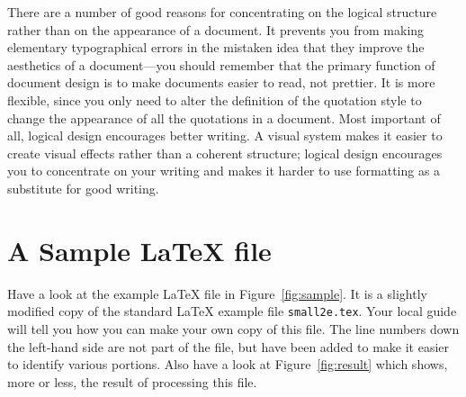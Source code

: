 \documentclass[10pt,a4paper]{article}
\newcommand{\fn}[1]{\hbox{\tt #1}}
\begin{document}
There are a number of good reasons for concentrating on the logical
structure rather than on the appearance of a document.  It prevents
you from making elementary typographical errors in the mistaken
idea that they improve the aesthetics of a document---you should
remember that the primary function of document design is to make
documents easier to read, not prettier.  It is more flexible, since
you only need to alter the definition of the quotation style
to change the appearance of all the quotations in a document.  Most
important of all, logical design encourages better writing.
A visual system makes it easier to create visual effects rather than
a coherent structure; logical design encourages you to concentrate on
your writing and makes it harder to use formatting as a substitute
for good writing.

\section{A Sample \LaTeX{} file}

Have a look at the example \LaTeX{} file in Figure~\ref{fig:sample}.  It
is a slightly modified copy of the standard \LaTeX{} example file
\fn{small2e.tex}.  Your local guide will tell you how you can make
your own copy of this file.  The line numbers down the left-hand side
are not part of the file, but have been added to make it easier to
identify various portions. Also have a look at Figure~\ref{fig:result} which
shows, more or less, the result of processing this file.
\end{document}
